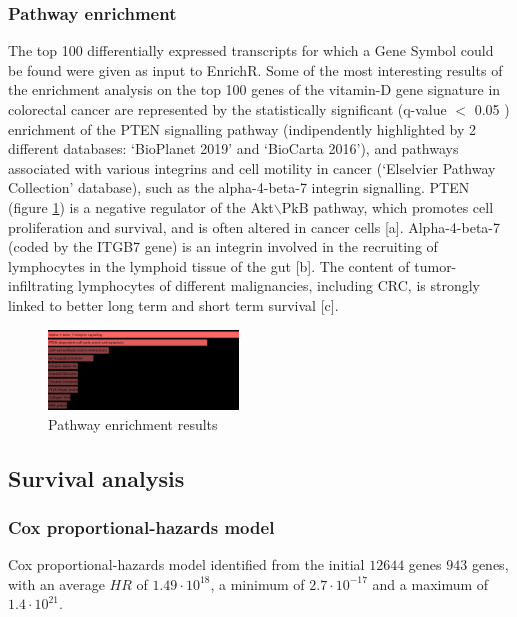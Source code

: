 \documentclass[fleqn,10pt]{SelfArx} %
\begin{document}
		\subsubsection{Pathway enrichment}
		The top 100 differentially expressed transcripts for which a Gene Symbol could be found were given as input to EnrichR.
		Some of the most interesting results of the enrichment analysis on the top 100 genes of the vitamin-D gene signature in colorectal cancer are represented by the statistically significant (q-value $<$ 0.05 ) enrichment of the PTEN signalling pathway (indipendently highlighted by 2 different databases: ‘BioPlanet 2019’ and ‘BioCarta 2016’), and pathways associated with various integrins and cell motility in cancer (‘Elselvier Pathway Collection’ database), such as the alpha-4-beta-7 integrin signalling.
PTEN (figure \ref{fig:pten}) is a negative regulator of the Akt$\backslash$PkB pathway, which promotes cell proliferation and survival, and is often altered in cancer cells [a].
Alpha-4-beta-7 (coded by the ITGB7 gene) is an integrin involved in the recruiting of lymphocytes in the lymphoid tissue of the gut [b].
The content of tumor-infiltrating lymphocytes of different malignancies, including CRC, is strongly linked to better long term and short term survival [c].


		\begin{figure}[ht]
			\includegraphics[width=0.45\textwidth]{figures/pten.png}
			\caption{Pathway enrichment results}
			\label{fig:pten}
		\end{figure}

	\subsection{Survival analysis}

		\subsubsection{Cox proportional-hazards model}
		Cox proportional-hazards model identified from the initial $12644$ genes $943$ genes, with an average $HR$ of $1.49\cdot 10^{18}$, a minimum of $2.7\cdot 10^{-17}$ and a maximum of $1.4\cdot 10^{21}$.
\end{document}

